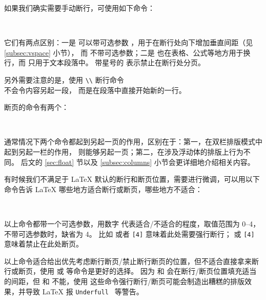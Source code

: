  
如果我们确实需要手动断行，可使用如下命令：
\begin{command}
\crcmd {} \qquad
\crcmd*{} \\
\end{command}

它们有两点区别：一是 \crcmd{} 可以带可选参数 ，用于在断行处向下增加垂直间距（见 \ref{subsec:vspace} 小节），
而  不带可选参数；二是 \crcmd{} 也在表格、公式等地方用于换行，而  只用于文本段落中。
带星号的 \crcmd{} 表示禁止在断行处分页。

\begin{example}
另外需要注意的是，使用 \verb|\\|
断行命令 \\ 不会令内容另起一段，
而是在段落中直接开始新的一行。
\end{example}

断页的命令有两个：
\begin{command}
 \\
\end{command}

通常情况下两个命令都起到另起一页的作用，区别在于：第一，在双栏排版模式中  起到另起一栏的作用， 则能够另起一页；第二，在涉及浮动体的排版上行为不同。
后文的 \ref{sec:float} 节以及 \ref{subsec:columns} 小节会更详细地介绍相关内容。

有时候我们不满足于 \LaTeX{} 默认的断行和断页位置，需要进行微调，可以用以下命令告诉 \LaTeX{} 哪些地方适合断行或断页，哪些地方不适合：
\begin{command}
 \quad {} \\
 \quad {}
\end{command}

以上命令都带一个可选参数，用数字  代表适合/不适合的程度，取值范围为 0--4，不带可选参数时，缺省为 4。
比如  或者 \texttt{[4]} 意味着此处需要强行断行； 或 \texttt{[4]}
意味着禁止在此处断页。

以上命令适合给出优先考虑断行断页/禁止断行断页的位置，但不适合直接拿来断行或断页，使用  或  等命令是更好的选择。
因为  和  会在断行/断页位置填充适当的间距，但  和  不能，使用
这些命令强行断行/断页可能会制造出糟糕的排版效果，并导致 \LaTeX{} 报 \texttt{Underfull } 等警告。

